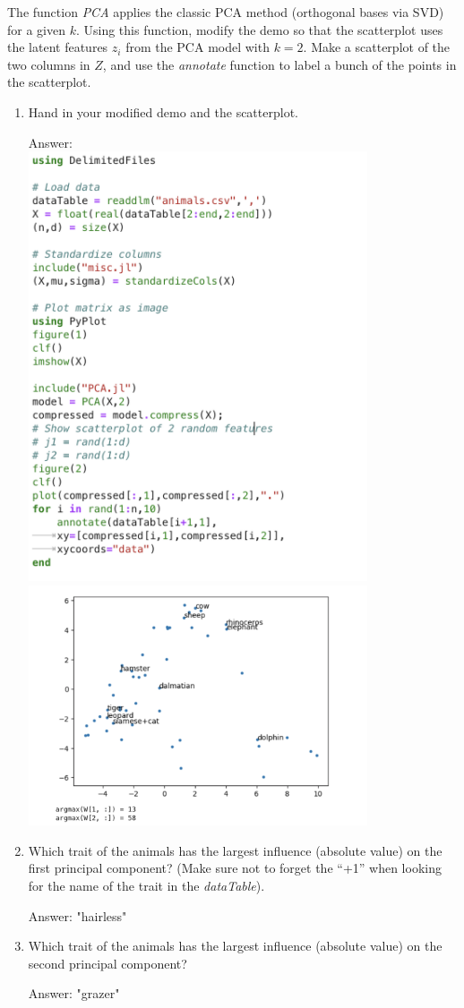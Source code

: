 \documentclass{article}
\def\ans#1{\par\gre{Answer: #1}}
\def\blu#1{{\color{blu}#1}}
\def\gre#1{{\color{gre}#1}}
\def\enum#1{\begin{enumerate}#1\end{enumerate}}
\begin{document}
The function \emph{PCA} applies the classic PCA method (orthogonal bases via SVD) for a given $k$. Using this function, modify the demo so that the scatterplot uses the latent features $z_i$ from the PCA model with $k=2$. Make a scatterplot of the two columns in $Z$, and use the \emph{annotate} function to label a bunch of the points in the scatterplot.
\blu{
\enum{
\item  Hand in your modified demo and the scatterplot.
\ans{\\
\includegraphics[width=10cm]{Q32Code.png}\\
\includegraphics[width=10cm]{Q321.png}}
\item Which trait of the animals has the largest influence (absolute value) on the first principal component? (Make sure not to forget the ``+1'' when looking for the name of the trait in the \emph{dataTable}).
\ans{
    "hairless"
}
\item Which trait of the animals has the largest influence (absolute value) on the second principal component?
\ans{
    "grazer"
}}
}
\end{document}
